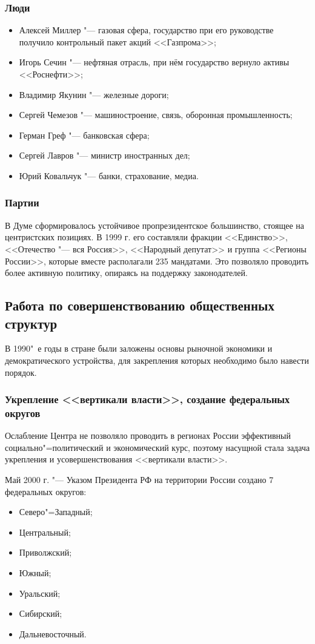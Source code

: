 \subsubsection{Люди}
\begin{itemize}
\item Алексей Миллер "--- газовая сфера, государство при его руководстве получило контрольный пакет акций <<Газпрома>>;
\item Игорь Сечин "--- нефтяная отрасль, при нём государство вернуло активы <<Роснефти>>;
\item Владимир Якунин "--- железные дороги;
\item Сергей Чемезов "--- машиностроение, связь, оборонная промышленность;
\item Герман Греф "--- банковская сфера;
\item Сергей Лавров "--- министр иностранных дел;
\item Юрий Ковальчук "--- банки, страхование, медиа.
\end{itemize}

\subsubsection{Партии}
В Думе сформировалось устойчивое пропрезидентское большинство, стоящее на центристских позициях. В 1999 г. его составляли фракции <<Единство>>, <<Отечество "--- вся Россия>>, <<Народный депутат>> и группа <<Регионы России>>, которые вместе располагали 235 мандатами. Это позволяло проводить более активную политику, опираясь на поддержку законодателей. 

\subsection{Работа по совершенствованию общественных структур}
В 1990"~е годы в стране были заложены основы рыночной экономики и демократического устройства, для закрепления которых необходимо было навести порядок.

\subsubsection{Укрепление <<вертикали власти>>, создание федеральных округов}
Ослабление Центра не позволяло проводить в регионах России эффективный социально"=политический и экономический курс, поэтому насущной стала задача укрепления и усовершенствования <<вертикали власти>>.

Май 2000 г. "--- Указом Президента РФ на территории России создано 7 федеральных округов:
\begin{itemize}
\item Северо"=Западный;
\item Центральный;
\item Приволжский;
\item Южный;
\item Уральский;
\item Сибирский;
\item Дальневосточный.
\end{itemize}

